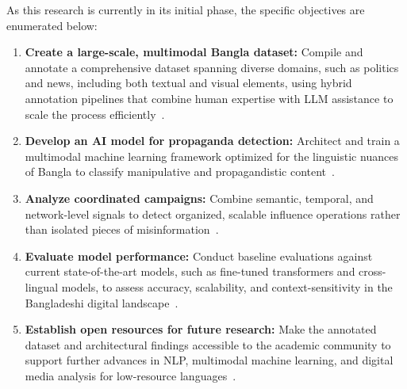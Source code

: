 As this research is currently in its initial phase, the specific objectives are
enumerated below:
\begin{enumerate}
  \item \textbf{Create a large-scale, multimodal Bangla dataset:} Compile and
        annotate a comprehensive dataset spanning diverse domains, such as politics
        and news, including both textual and visual elements, using hybrid
        annotation pipelines that combine human expertise with LLM assistance to
        scale the process efficiently~\cite{hossain2020}.
  \item \textbf{Develop an AI model for propaganda detection:} Architect and train
        a multimodal machine learning framework optimized for the linguistic
        nuances of Bangla to classify manipulative and propagandistic
        content~\cite{hossain2020}.
  \item \textbf{Analyze coordinated campaigns:} Combine semantic, temporal, and
        network-level signals to detect organized, scalable influence operations
        rather than isolated pieces of misinformation~\cite{ng2023}.
  \item \textbf{Evaluate model performance:} Conduct baseline evaluations against
        current state-of-the-art models, such as fine-tuned transformers and
        cross-lingual models, to assess accuracy, scalability, and
        context-sensitivity in the Bangladeshi digital landscape~\cite{hossain2020}.
  \item \textbf{Establish open resources for future research:} Make the annotated
        dataset and architectural findings accessible to the academic community to
        support further advances in NLP, multimodal machine learning, and digital
        media analysis for low-resource languages~\cite{hossain2020}.
\end{enumerate}

